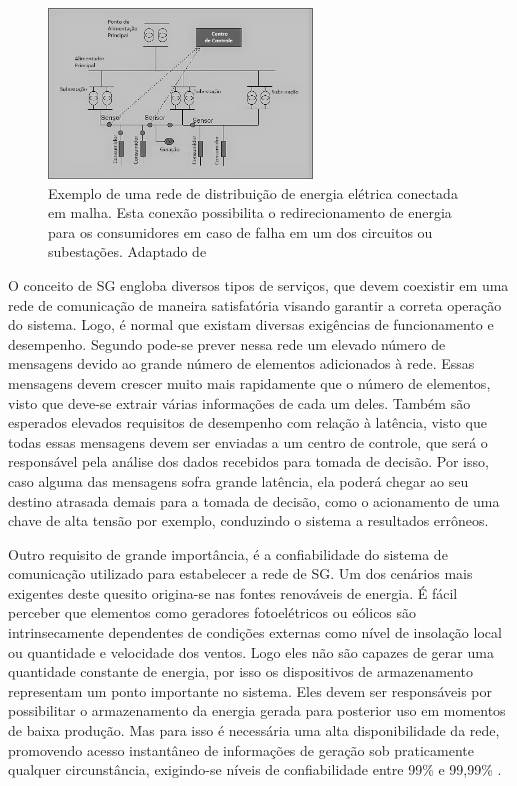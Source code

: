 \documentclass[12pt]{article}
\begin{document}
\begin{figure}[ht] %
	\centering
	\includegraphics[width=7cm]{Rede_Distribuicao}
	\caption{Exemplo de uma rede de distribuição de energia elétrica conectada em malha. Esta conexão possibilita o redirecionamento de energia para os consumidores em caso de falha em um dos circuitos ou subestações. Adaptado de \cite{Mag_Bouhafs2012}}
	\label{fig_rede_distribuicao}
\end{figure}

O conceito de SG engloba diversos tipos de serviços, que devem coexistir em uma rede de comunicação de maneira satisfatória visando garantir a correta operação do sistema. Logo, é normal que existam diversas exigências de funcionamento e desempenho. Segundo \cite{Art_Aggarwal2010} pode-se prever nessa rede um elevado número de mensagens devido ao grande número de elementos adicionados à rede. Essas mensagens devem crescer muito mais rapidamente que o número de elementos, visto que deve-se extrair várias informações de cada um deles. Também são esperados elevados requisitos de desempenho com relação à latência, visto que todas essas mensagens devem ser enviadas a um centro de controle, que será o responsável pela análise dos dados recebidos para tomada de decisão. Por isso, caso alguma das mensagens sofra grande latência, ela poderá chegar ao seu destino atrasada demais para a tomada de decisão, como o acionamento de uma chave de alta tensão por exemplo, conduzindo o sistema a resultados errôneos.

Outro requisito de grande importância, é a confiabilidade do sistema de comunicação utilizado para estabelecer a rede de SG. Um dos cenários mais exigentes deste quesito origina-se nas fontes renováveis de energia. É fácil perceber que elementos como geradores fotoelétricos ou eólicos são intrinsecamente dependentes de condições externas como nível de insolação local ou quantidade e velocidade dos ventos. Logo eles não são capazes de gerar uma quantidade constante de energia, por isso os dispositivos de armazenamento representam um ponto importante no sistema. Eles devem ser responsáveis por possibilitar o armazenamento da energia gerada para posterior uso em momentos de baixa produção. Mas para isso é necessária uma alta disponibilidade da rede, promovendo acesso instantâneo de informações de geração sob praticamente qualquer circunstância, exigindo-se níveis de confiabilidade entre 99\% e 99,99\% \cite{Art_Gungor2013}.
\end{document}
